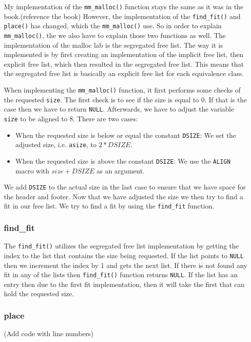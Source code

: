 \documentclass[11pt]{article}
\newcommand{\code}[1]{{\colorbox{lightgray!15}{\color{orange}\texttt{#1}}}}
\newcommand{\temp}[1]{{\color{red}#1}}
\begin{document}
My implementation of the \code{mm\_malloc()} function stays the same as it was in the book.\temp{(reference the book)}
However, the implementation of the \code{find\_fit()} and \code{place()} has changed, which the \code{mm\_malloc()} use. So in order to explain \code{mm\_malloc()},
the we also have to explain those two functions as well.
The implementation of the malloc lab is the segregated free list. 
The way it is implemented is by first creating an implementation of the implicit free list, then explicit free list, 
which then resulted in the segregated free list.
This means that the segregated free list is basically an explicit free list for each equivalence class.

When implementing the \code{mm\_malloc()} function, it first performs some checks of the requested \code{size}. The first check is to see if the size is equal to 0. If that is the case then we have to return \code{NULL}.
Afterwards, we have to adjust the variable \code{size} to be aligned to 8. There are two cases:
\begin{itemize}
    \item When the requested size is below or equal the constant \code{DSIZE}: We set the adjusted size, i.e. \code{asize}, to $2 * DSIZE$.
    \item When the requested size is above the constant \code{DSIZE}: We use the \code{ALIGN} macro with $size + DSIZE$ as an argument.
\end{itemize}

We add \code{DSIZE} to the actual size in the last case to ensure that we have space for the header and footer.
Now that we have adjusted the size we then try to find a fit in our free list. 
We try to find a fit by using the \code{find\_fit} function.

\subsubsection{find\_fit}
The \code{find\_fit()} utilizes the segregated free list implementation by getting the index to the list that contains the size being requested. 
If the list points to \code{NULL} then we increment the index by 1 and gets the next list. 
If there is not found any fit in any of the lists then \code{find\_fit()} function returns \code{NULL}.
If the list has an entry then due to the first fit implementation, then it will take the first that can hold the requested size.

\subsubsection{place}
\temp{(Add code with line numbers)}
\end{document}
